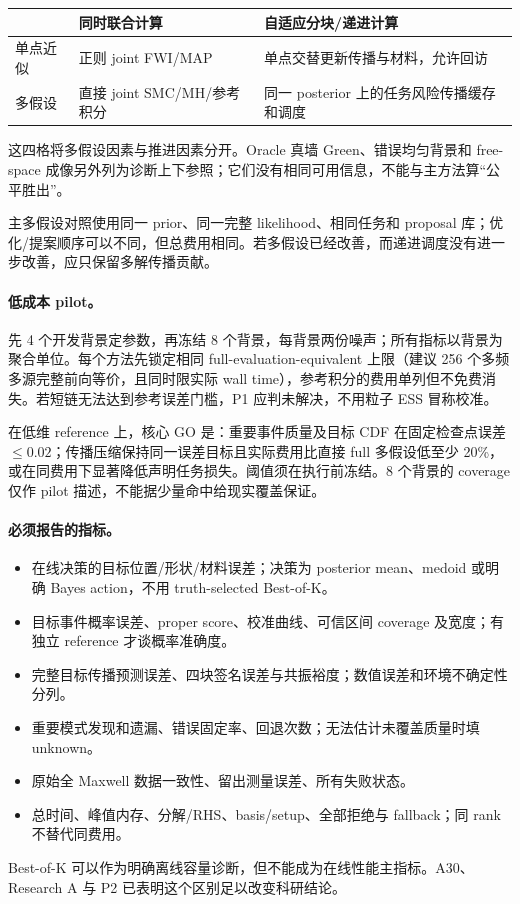 \begin{center}
\begin{tabular}{p{29mm}p{55mm}p{62mm}}
\toprule
 & 同时联合计算 & 自适应分块/递进计算\\
\midrule
单点近似 & 正则 joint FWI/MAP & 单点交替更新传播与材料，允许回访\\
多假设 & 直接 joint SMC/MH/参考积分 & 同一 posterior 上的任务风险传播缓存和调度\\
\bottomrule
\end{tabular}
\end{center}
这四格将多假设因素与推进因素分开。Oracle 真墙 Green、错误均匀背景和 free-space 成像另外列为诊断上下参照；它们没有相同可用信息，不能与主方法算“公平胜出”。

主多假设对照使用同一 prior、同一完整 likelihood、相同任务和 proposal 库；优化/提案顺序可以不同，但总费用相同。若多假设已经改善，而递进调度没有进一步改善，应只保留多解传播贡献。

\paragraph{低成本 pilot。}
先 4 个开发背景定参数，再冻结 8 个背景，每背景两份噪声；所有指标以背景为聚合单位。每个方法先锁定相同 full-evaluation-equivalent 上限（建议 256 个多频多源完整前向等价，且同时限实际 wall time），参考积分的费用单列但不免费消失。若短链无法达到参考误差门槛，P1 应判未解决，不用粒子 ESS 冒称校准。

在低维 reference 上，核心 GO 是：重要事件质量及目标 CDF 在固定检查点误差 $\le0.02$；传播压缩保持同一误差目标且实际费用比直接 full 多假设低至少 20\%，或在同费用下显著降低声明任务损失。阈值须在执行前冻结。8 个背景的 coverage 仅作 pilot 描述，不能据少量命中给现实覆盖保证。

\paragraph{必须报告的指标。}
\begin{itemize}
\item 在线决策的目标位置/形状/材料误差；决策为 posterior mean、medoid 或明确 Bayes action，不用 truth-selected Best-of-K。
\item 目标事件概率误差、proper score、校准曲线、可信区间 coverage 及宽度；有独立 reference 才谈概率准确度。
\item 完整目标传播预测误差、四块签名误差与共振裕度；数值误差和环境不确定性分列。
\item 重要模式发现和遗漏、错误固定率、回退次数；无法估计未覆盖质量时填 unknown。
\item 原始全 Maxwell 数据一致性、留出测量误差、所有失败状态。
\item 总时间、峰值内存、分解/RHS、basis/setup、全部拒绝与 fallback；同 rank 不替代同费用。
\end{itemize}
Best-of-K 可以作为明确离线容量诊断，但不能成为在线性能主指标。A30、Research A 与 P2 已表明这个区别足以改变科研结论。\cite{R_A30,R_A,R_P2}

